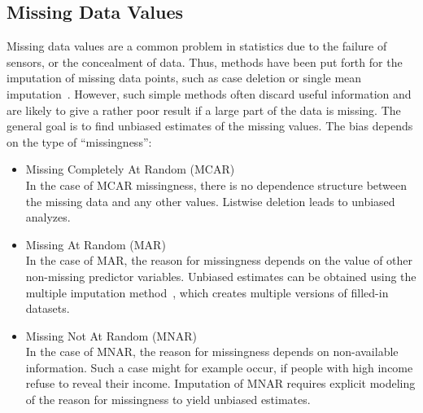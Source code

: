 \documentclass[a4paper,11pt]{article}
\begin{document}
\subsection{Missing Data Values}

Missing data values are a common problem in statistics due to the
failure of sensors, or the concealment of data. Thus, methods have
been put forth for the imputation of missing data points, such as case
deletion or single mean imputation~\cite{schafer2002missing}. However,
such simple methods often discard useful information and are likely to
give a rather poor result if a large part of the data is missing. The
general goal is to find unbiased estimates of the missing values. The
bias depends on the type of ``missingness'':

\begin{itemize}
\item Missing Completely At Random (MCAR)\\
  In the case of MCAR missingness, there is no dependence structure
  between the missing data and any other values. Listwise deletion
  leads to unbiased analyzes.
\item Missing At Random (MAR)\\
  In the case of MAR, the reason for missingness depends on the value
  of other non-missing predictor variables. Unbiased estimates can be
  obtained using the multiple imputation method~\cite{de2013multiple},
  which creates multiple versions of filled-in datasets.
\item Missing Not At Random (MNAR)\\
  In the case of MNAR, the reason for missingness depends on
  non-available information. Such a case might for example occur, if
  people with high income refuse to reveal their income. Imputation of
  MNAR requires explicit modeling of the reason for missingness to
  yield unbiased estimates.
\end{itemize}
\end{document}

